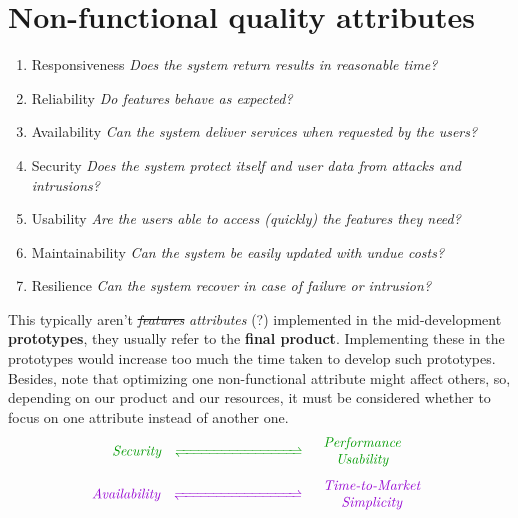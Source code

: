 \section{Non-functional quality attributes}
\begin{enumerate}
    \item Responsiveness \textit{Does the system return results in reasonable time?}
    \item Reliability \textit{Do features behave as expected?}
    \item Availability \textit{Can the system deliver services when requested by the users?}
    \item Security \textit{Does the system protect itself and user data from attacks and intrusions?}
    \item Usability \textit{Are the users able to access (quickly) the features they need?}
    \item Maintainability \textit{Can the system be easily updated with undue costs?}
    \item Resilience \textit{Can the system recover in case of failure or intrusion?}
\end{enumerate}
This typically aren't \textit{\st{features}} \textit{attributes} (?) implemented in the mid-development \textbf{prototypes},
they usually refer to the \textbf{final product}.
Implementing these in the prototypes would increase too much the time taken to develop such prototypes.
\nl
Besides, note that optimizing one non-functional attribute might affect others,
so, depending on our product and our resources,
it must be considered whether to focus on one attribute instead of another one.
\[
    \color{OliveGreen}
    \begin{array}[pos]{ccc}
        \textit{Security} & \xrightleftharpoons{\hspace*{3cm}} &
        \begin{array}{c}
            \textit{Performance} \\
            \textit{Usability}
        \end{array}
    \end{array}
\]
\[
    \color{mauve}
    \begin{array}[pos]{ccc}
        \textit{Availability} & \xrightleftharpoons{\hspace*{3cm}} &
        \begin{array}{c}
            \textit{Time-to-Market} \\
            \textit{Simplicity}
        \end{array}
    \end{array}
\]


